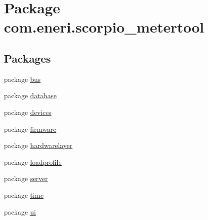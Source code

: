 \hypertarget{namespacecom_1_1eneri_1_1scorpio__metertool}{}\section{Package com.\+eneri.\+scorpio\+\_\+metertool}
\label{namespacecom_1_1eneri_1_1scorpio__metertool}
\subsection*{Packages}
\begin{DoxyCompactItemize}
\item 
package \hyperlink{namespacecom_1_1eneri_1_1scorpio__metertool_1_1bus}{bus}
\item 
package \hyperlink{namespacecom_1_1eneri_1_1scorpio__metertool_1_1database}{database}
\item 
package \hyperlink{namespacecom_1_1eneri_1_1scorpio__metertool_1_1devices}{devices}
\item 
package \hyperlink{namespacecom_1_1eneri_1_1scorpio__metertool_1_1firmware}{firmware}
\item 
package \hyperlink{namespacecom_1_1eneri_1_1scorpio__metertool_1_1hardwarelayer}{hardwarelayer}
\item 
package \hyperlink{namespacecom_1_1eneri_1_1scorpio__metertool_1_1loadprofile}{loadprofile}
\item 
package \hyperlink{namespacecom_1_1eneri_1_1scorpio__metertool_1_1server}{server}
\item 
package \hyperlink{namespacecom_1_1eneri_1_1scorpio__metertool_1_1time}{time}
\item 
package \hyperlink{namespacecom_1_1eneri_1_1scorpio__metertool_1_1ui}{ui}
\end{DoxyCompactItemize}
